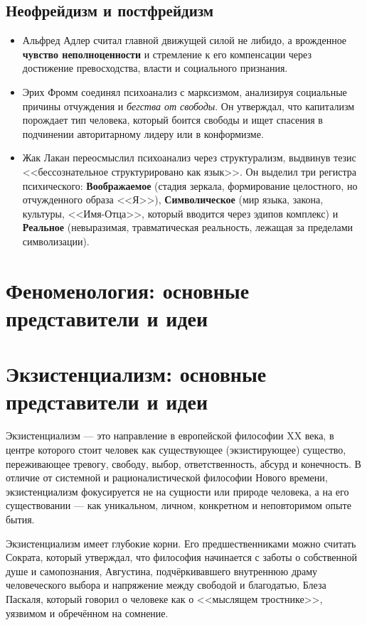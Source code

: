 \documentclass[12pt,a4paper]{article}
\begin{document}
	\subsection{Неофрейдизм и постфрейдизм}
	\begin{itemize}
		\item Альфред Адлер считал главной движущей силой не либидо, а врожденное \textbf{чувство неполноценности} и стремление к его компенсации через достижение превосходства, власти и социального признания.
		\item Эрих Фромм соединял психоанализ с марксизмом, анализируя социальные причины отчуждения и \textit{бегства от свободы}. Он утверждал, что капитализм порождает тип человека, который боится свободы и ищет спасения в подчинении авторитарному лидеру или в конформизме.
		\item Жак Лакан переосмыслил психоанализ через структурализм, выдвинув тезис <<бессознательное структурировано как язык>>. Он выделил три регистра психического: \textbf{Воображаемое} (стадия зеркала, формирование целостного, но отчужденного образа <<Я>>), \textbf{Символическое} (мир языка, закона, культуры, <<Имя-Отца>>, который вводится через эдипов комплекс) и \textbf{Реальное} (невыразимая, травматическая реальность, лежащая за пределами символизации).
	\end{itemize}
	
	\section{Феноменология: основные представители и идеи}
	
	\section{Экзистенциализм: основные представители и идеи~\checkmark}
	Экзистенциализм — это направление в европейской философии XX века, в центре которого стоит человек как существующее (экзистирующее) существо, переживающее тревогу, свободу, выбор, ответственность, абсурд и конечность. В отличие от системной и рационалистической философии Нового времени, экзистенциализм фокусируется не на сущности или природе человека, а на его существовании — как уникальном, личном, конкретном и неповторимом опыте бытия.
	
	Экзистенциализм имеет глубокие корни. Его предшественниками можно считать Сократа, который утверждал, что философия начинается с заботы о собственной душе и самопознания, Августина, подчёркивавшего внутреннюю драму человеческого выбора и напряжение между свободой и благодатью, Блеза Паскаля, который говорил о человеке как о <<мыслящем тростнике>>, уязвимом и обречённом на сомнение.
	
\end{document}
